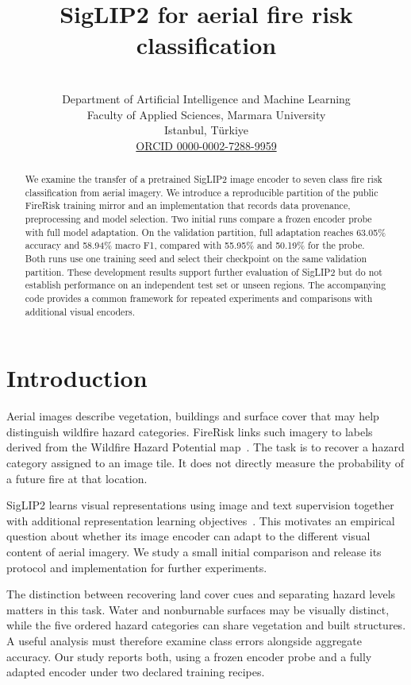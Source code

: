 \documentclass[10pt,a4paper]{article}
\title{SigLIP2 for aerial fire risk classification}
\author{\paperauthors\\[0.4em]
  \small Department of Artificial Intelligence and Machine Learning\\
  \small Faculty of Applied Sciences, Marmara University\\
  \small Istanbul, Türkiye\\[0.2em]
  \small \href{https://orcid.org/0000-0002-7288-9959}{ORCID 0000-0002-7288-9959}}
\date{}
\begin{document}
\maketitle

\begin{abstract}
We examine the transfer of a pretrained SigLIP2 image encoder to seven class
fire risk classification from aerial imagery. We introduce a reproducible
partition of the public FireRisk training mirror and an implementation that
records data provenance, preprocessing and model selection. Two initial runs
compare a frozen encoder probe with full model adaptation. On the validation
partition, full adaptation reaches 63.05\% accuracy and 58.94\% macro F1,
compared with 55.95\% and 50.19\% for the probe. Both runs use one training
seed and select their checkpoint on the same validation partition. These
development results support further evaluation of SigLIP2 but do not establish
performance on an independent test set or unseen regions. The accompanying
code provides a common framework for repeated experiments and comparisons
with additional visual encoders.
\end{abstract}

\section{Introduction}

Aerial images describe vegetation, buildings and surface cover that may help
distinguish wildfire hazard categories. FireRisk links such imagery to labels
derived from the Wildfire Hazard Potential map~\citep{shen2023firerisk}. The
task is to recover a hazard category assigned to an image tile. It does not
directly measure the probability of a future fire at that location.

SigLIP2 learns visual representations using image and text supervision together
with additional representation learning objectives~\citep{tschannen2025siglip2}.
This motivates an empirical question about whether its image encoder can
adapt to the different visual content of aerial imagery. We study a small
initial comparison and release its protocol and implementation for further
experiments.

The distinction between recovering land cover cues and separating hazard
levels matters in this task. Water and nonburnable surfaces may be visually
distinct, while the five ordered hazard categories can share vegetation and
built structures. A useful analysis must therefore examine class errors
alongside aggregate accuracy. Our study reports both, using a frozen encoder
probe and a fully adapted encoder under two declared training recipes.
\end{document}
